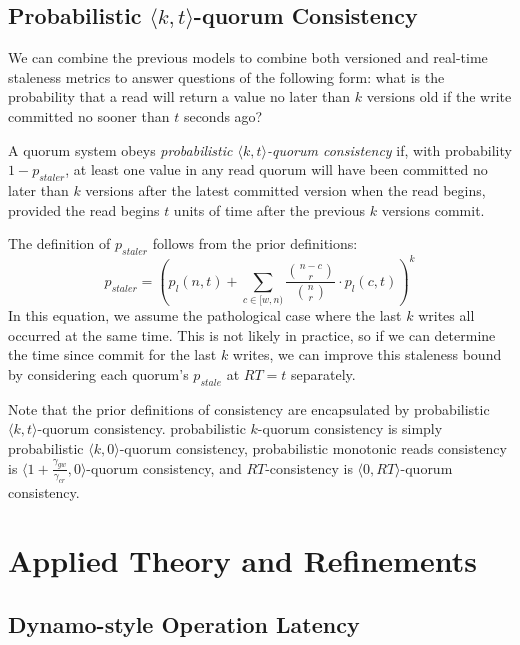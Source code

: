 \documentclass{vldb}
\begin{document}
\subsection{Probabilistic $\langle k, t
  \rangle$-quorum Consistency}

We can combine the previous models to combine both versioned and
real-time staleness metrics to answer questions of the following form:
what is the probability that a read will return a value no later than
$k$ versions old if the write committed no sooner than $t$ seconds
ago?
\begin{definition}
A quorum system obeys \textit{probabilistic $\langle k, t
  \rangle$-quorum consistency} if, with probability $1-p_{staler}$, at
least one value in any read quorum will have been committed no later
than $k$ versions after the latest committed version when the read
begins, provided the read begins $t$ units of time after the previous
$k$ versions commit.
\end{definition}
The definition of $p_{staler}$ follows from the prior definitions:
\begin{equation}
p_{staler} = \left(p_l(n, t)+\sum_{c\in[w, n)} \frac{{n-c \choose r}}{{n \choose r}} \cdot p_l(c, t)\right)^k
\end{equation}
In this equation, we assume the pathological case where the last $k$
writes all occurred at the same time.  This is not likely in practice,
so if we can determine the time since commit for the last $k$ writes,
we can improve this staleness bound by considering each quorum's $p_{stale}$ at $RT=t$ separately.

Note that the prior definitions of consistency are encapsulated by
probabilistic $\langle k, t \rangle$-quorum consistency. probabilistic
$k$-quorum consistency is simply probabilistic $\langle k, 0
\rangle$-quorum consistency, probabilistic monotonic reads consistency
is $\langle 1+\frac{\gamma_{gw}}{\gamma_{cr}}, 0 \rangle$-quorum
consistency, and $RT$-consistency is $\langle 0, RT \rangle$-quorum
consistency.

\section{Applied Theory and Refinements}
\label{sec:optimize}

\subsection{Dynamo-style Operation Latency}
\end{document}
